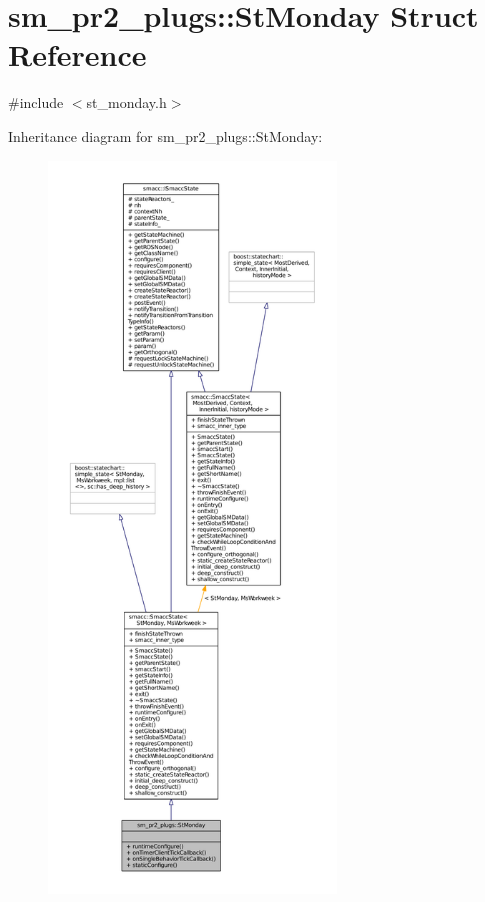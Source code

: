 \hypertarget{structsm__pr2__plugs_1_1StMonday}{}\section{sm\+\_\+pr2\+\_\+plugs\+:\+:St\+Monday Struct Reference}
\label{structsm__pr2__plugs_1_1StMonday}


{\ttfamily \#include $<$st\+\_\+monday.\+h$>$}



Inheritance diagram for sm\+\_\+pr2\+\_\+plugs\+:\+:St\+Monday\+:
\nopagebreak
\begin{figure}[H]
\begin{center}
\leavevmode
\includegraphics[height=550pt]{structsm__pr2__plugs_1_1StMonday__inherit__graph}
\end{center}
\end{figure}


